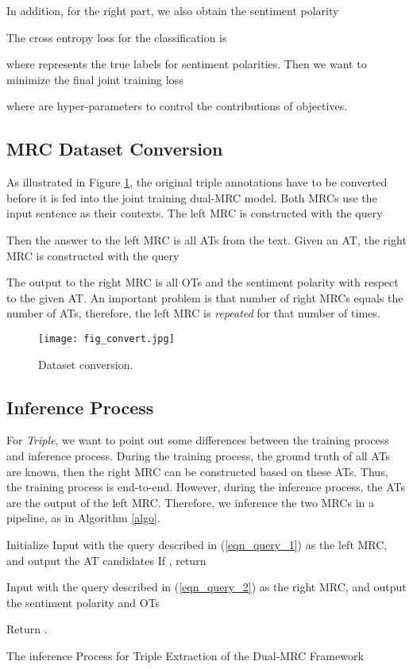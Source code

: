\documentclass[letterpaper]{article} \usepackage{aaai21}  \usepackage{times}  \usepackage{helvet} \usepackage{courier}  \usepackage[hyphens]{url}  \usepackage{graphicx} \urlstyle{rm} \def\UrlFont{\rm}  \usepackage{natbib}  \usepackage{caption}
\begin{document}
In addition, for the right part, we also obtain the sentiment polarity 

The cross entropy loss for the classification is 

where  represents the true labels for sentiment polarities.
Then we want to minimize the final joint training loss 

where  are hyper-parameters to control the contributions of objectives.

\subsection{MRC Dataset Conversion}
As illustrated in Figure \ref{fig_convert}, the original triple annotations have to be converted before it is fed into
the joint training dual-MRC model. Both MRCs use the input sentence as their contexts.
The left MRC is constructed with the query 

Then the answer to the left MRC is all ATs from the text.  
Given an AT, the right MRC is constructed with the query

The output to the right MRC is all OTs and the sentiment polarity with respect to the given AT. 
An important problem is that number of right MRCs equals the number of ATs, therefore, the left MRC is \emph{repeated} for that number of times. 
\begin{figure}
    \centering
    \texttt{[image: fig\_convert.jpg]}
    \caption{Dataset conversion.} \label{fig_convert}
\end{figure}



\subsection{Inference Process}
For \emph{Triple}, we want to point out some differences between the training process and inference process.
During the training process, the ground truth of all ATs are known, then the right MRC can be constructed based on these ATs. 
Thus, the training process is end-to-end.
However, during the inference process, the ATs are the output of the left MRC.
Therefore, we inference the two MRCs in a pipeline, as in Algorithm \ref{algo}.
\begin{algorithm}
    \SetAlgoLined
    Initialize \;
    Input  with the query  described in (\ref{eqn_query_1}) as the left MRC, and output the AT candidates \;
    If , return \;
    \For{}
    {
        Input  with the query  described in (\ref{eqn_query_2}) as the right MRC, 
        and output the sentiment polarity  and OTs \;
        
    }
    Return .
     \caption{The inference Process for Triple Extraction of the Dual-MRC Framework} \label{algo}
\end{algorithm}
\end{document}

